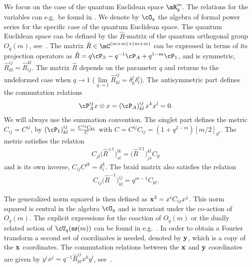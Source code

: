 We focus on the case of the quantum Euclidean space $\mR^m_q$. The relations for the variables can e.g.\ be found in \cite{MR1328733, MR2006509, MR1361741}. We denote by $\cO_q$ the algebra of formal power series for the specif\/ic case of the quantum Euclidean space. The quantum Euclidean space can be def\/ined by the $\hat{R}$-matrix of the quantum orthogonal group $O_q(m)$, see~\cite{MR1097174, MR1239953}. The matrix $\hat{R}\in\mC^{(m\times m)\times(m\times m)}$ can be expressed in terms of its projection operators as $\hat{R}=q\cP_S-q^{-1}\cP_A+q^{1-m}\cP_1$, and is symmetric, $\hat{R}^{ij}_{kl}=\hat{R}_{ij}^{kl}$. The matrix $\hat{R}$ depends on the parameter $q$ and returns to the undeformed case when $q\to1$ ($\lim\limits_{q\to1}\hat{R}^{ij}_{kl}=\delta^j_k\delta^i_l$). The antisymmetric part def\/ines the commutation relations
\begin{gather*}
\cP_A^{ij}x\otimes x=\left(\cP_A\right)^{ij}_{kl}x^kx^l = 0.
\end{gather*}
We will always use the summation convention. The singlet part def\/ines the metric $C_{ij}=C^{ij}$, by $\left(\cP_1\right)^{ij}_{kl}=\frac{C^{ij}C_{kl}}{C}$ with $C=C^{ij}C_{ij}=(1+q^{2-m})[m/2]_{q^2}$. The metric satisf\/ies the relation
\begin{gather}
\label{CR}
C_{jl}\big(\hat{R}^{\pm 1}\big)^{lk}_{st} = \big(\hat{R}^{\mp 1}\big)^{kl}_{js}C_{lt}
\end{gather}
and is its own inverse, $C_{ij}C^{jk}=\delta^k_i$. The braid matrix also satisf\/ies the relation
\begin{gather}
\label{CR2}
C_{ij}\big(\hat{R}^{-1}\big)^{ij}_{kl} = q^{m-1}C_{kl}.
\end{gather}

The generalized norm squared is then def\/ined as $\bold{x}^2=x^iC_{ij}x^j$. This norm squared is central in the algebra $\cO_q$ and is invariant under the co-action of $O_q(m)$. The explicit expressions for the coaction of $O_q(m)$ or the dually related action of $\cU_q(\mathfrak{so}(m))$ can be found in e.g.~\cite{MR1138053, MR1239953, MR1328733, MR2006509}. In order to obtain a Fourier transform a second set of coordinates is needed, denoted by $\bold{y}$, which is a copy of the $\bold{x}$ coordinates. The commutation relations between the $\bold{x}$ and $\bold{y}$ coordinates are given by $y^ix^j=q^{-1}\hat{R}^{ij}_{kl}x^ky^l$, see~\cite{MR1303081, MR1235979, MR1317458}.


